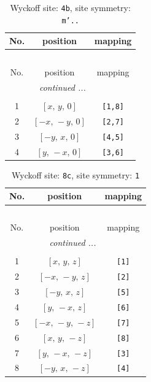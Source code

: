 \documentclass[fleqn,8pt]{jsarticle}
\begin{document}
\begin{longtable}{ccc}
\caption{Wyckoff site: {\tt 4b}, site symmetry: {\tt m'..}}
 \\
 \hline \hline
No. & position & mapping \\ \hline \endfirsthead

\multicolumn{2}{l}{\tablename\ \thetable{}} \\
 \hline \hline
No. & position & mapping \\ \hline \endhead

 \hline \hline
\multicolumn{2}{r}{\footnotesize\it continued ...} \\ \endfoot

 \hline \hline
\multicolumn{2}{r}{} \\ \endlastfoot

1 & $\left[ x,\, y,\, 0 \right]$ & {\tt [1,8]} \\ \hline
2 & $\left[ - x,\, - y,\, 0 \right]$ & {\tt [2,7]} \\ \hline
3 & $\left[ - y,\, x,\, 0 \right]$ & {\tt [4,5]} \\ \hline
4 & $\left[ y,\, - x,\, 0 \right]$ & {\tt [3,6]} \\
\end{longtable}
\renewcommand{\arraystretch}{1.2}
\begin{longtable}{ccc}
\caption{Wyckoff site: {\tt 8c}, site symmetry: {\tt 1}}
 \\
 \hline \hline
No. & position & mapping \\ \hline \endfirsthead

\multicolumn{2}{l}{\tablename\ \thetable{}} \\
 \hline \hline
No. & position & mapping \\ \hline \endhead

 \hline \hline
\multicolumn{2}{r}{\footnotesize\it continued ...} \\ \endfoot

 \hline \hline
\multicolumn{2}{r}{} \\ \endlastfoot

1 & $\left[ x,\, y,\, z \right]$ & {\tt [1]} \\ \hline
2 & $\left[ - x,\, - y,\, z \right]$ & {\tt [2]} \\ \hline
3 & $\left[ - y,\, x,\, z \right]$ & {\tt [5]} \\ \hline
4 & $\left[ y,\, - x,\, z \right]$ & {\tt [6]} \\ \hline
5 & $\left[ - x,\, - y,\, - z \right]$ & {\tt [7]} \\ \hline
6 & $\left[ x,\, y,\, - z \right]$ & {\tt [8]} \\ \hline
7 & $\left[ y,\, - x,\, - z \right]$ & {\tt [3]} \\ \hline
8 & $\left[ - y,\, x,\, - z \right]$ & {\tt [4]} \\
\end{longtable}
\end{document}
